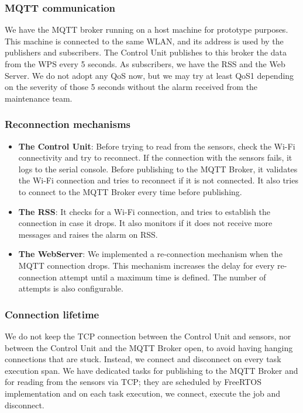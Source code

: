 \documentclass[11pt]{article}
\begin{document}
\subsubsection{MQTT communication}

We have the MQTT broker running on a host machine for prototype purposes. This machine is connected to the same WLAN, and its address is used by the publishers and subscribers.
The Control Unit publishes to this broker the data from the WPS every 5 seconds.
As subscribers, we have the RSS and the Web Server. We do not adopt any QoS now, but we may try at least QoS1 \cite{c2} depending on the severity of those 5 seconds without the alarm received from the maintenance team.

\subsubsection{Reconnection mechanisms}

\begin{itemize}
	\item  \textbf{The Control Unit}: Before trying to read from the sensors, check the Wi-Fi connectivity and try to reconnect.
If the connection with the sensors fails, it logs to the serial console.
Before publishing to the MQTT Broker, it validates the Wi-Fi connection and tries to reconnect if it is not connected. It also tries to connect to the MQTT Broker every time before publishing.

	\item  \textbf{The RSS}: It checks for a Wi-Fi connection, and tries to establish the connection in case it drops.
It also monitors if it does not receive more messages and raises the alarm on RSS.

	\item  \textbf{The WebServer}: We implemented a re-connection mechanism when the MQTT connection drops. This mechanism increases the delay for every re-connection attempt until a maximum time is defined. The number of attempts is also configurable.
\end{itemize}

\subsubsection{Connection lifetime}

We do not keep the TCP connection between the Control Unit and sensors, nor between the Control Unit and the MQTT Broker open, to avoid having hanging connections that are stuck. Instead, we connect and disconnect on every task execution span. 
We have dedicated tasks for publishing to the MQTT Broker and for reading from the sensors via TCP; they are scheduled by FreeRTOS implementation and on each task execution, we connect, execute the job and disconnect.
\end{document}
